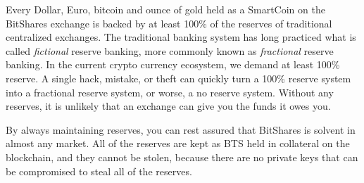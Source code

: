 Every Dollar, Euro, bitcoin and ounce of gold held as a SmartCoin on the
BitShares exchange is backed by at least 100\% of the reserves of traditional
centralized exchanges. The traditional banking system has long practiced what
is called \emph{fictional} reserve banking, more commonly known as
\emph{fractional} reserve banking. In the current crypto currency ecosystem, we
demand at least 100\% reserve. A single hack, mistake, or theft can quickly
turn a 100\% reserve system into a fractional reserve system, or worse, a no
reserve system.  Without any reserves, it is unlikely that an exchange can give
you the funds it owes you.

By always maintaining reserves, you can rest assured that BitShares is solvent
in almost any market. All of the reserves are kept as BTS held in collateral on
the blockchain, and they cannot be stolen, because there are no private keys
that can be compromised to steal all of the reserves.
